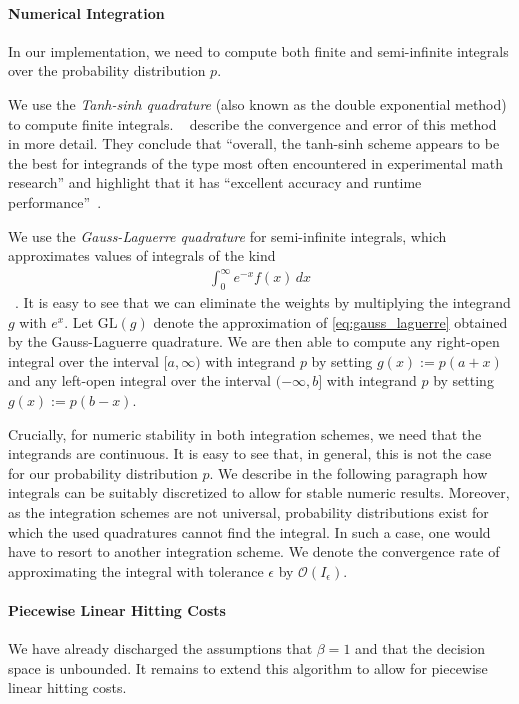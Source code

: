 \paragraph{Numerical Integration} In our implementation, we need to compute both finite and semi-infinite integrals over the probability distribution $p$.

We use the \emph{Tanh-sinh quadrature} (also known as the double exponential method) to compute finite integrals. \citeauthor*{Bailey2005}~\cite{Bailey2005} describe the convergence and error of this method in more detail. They conclude that ``overall, the tanh-sinh scheme appears to be the best
for integrands of the type most often encountered in experimental math research'' and highlight that it has ``excellent accuracy and runtime performance''~\cite{Bailey2005}.

We use the \emph{Gauss-Laguerre quadrature} for semi-infinite integrals, which approximates values of integrals of the kind \begin{align}\label{eq:gauss_laguerre}
    \int_0^{\infty} e^{-x} f(x) \,dx
\end{align}~\cite{Weisstein}. It is easy to see that we can eliminate the weights by multiplying the integrand $g$ with $e^x$. Let $\text{GL}(g)$ denote the approximation of \cref{eq:gauss_laguerre} obtained by the Gauss-Laguerre quadrature. We are then able to compute any right-open integral over the interval $[{a,\infty})$ with integrand $p$ by setting $g(x) := p(a+x)$ and any left-open integral over the interval $({-\infty,b}]$ with integrand $p$ by setting $g(x) := p(b-x)$.

Crucially, for numeric stability in both integration schemes, we need that the integrands are continuous. It is easy to see that, in general, this is not the case for our probability distribution $p$. We describe in the following paragraph how integrals can be suitably discretized to allow for stable numeric results. Moreover, as the integration schemes are not universal, probability distributions exist for which the used quadratures cannot find the integral. In such a case, one would have to resort to another integration scheme. We denote the convergence rate of approximating the integral with tolerance $\epsilon$ by $\mathcal{O}(I_{\epsilon})$.

\paragraph{Piecewise Linear Hitting Costs} We have already discharged the assumptions that $\beta = 1$ and that the decision space is unbounded. It remains to extend this algorithm to allow for piecewise linear hitting costs.

